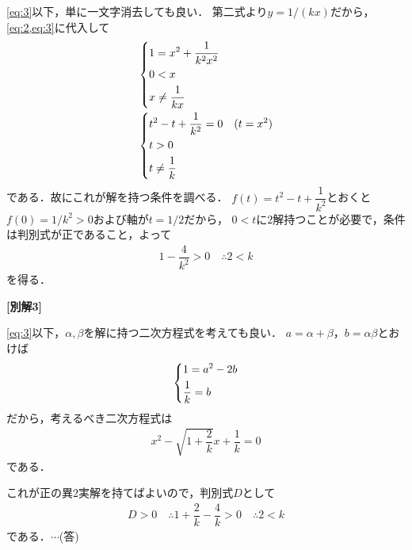 \documentclass[../../main.tex]{subfiles}
\begin{document}
\cref{eq:3}以下，単に一文字消去しても良い．
第二式より$y = 1/(kx)$だから，\cref{eq:2,eq:3}に代入して
\begin{align}
  &
  \begin{dcases}
    1 = x^2 + \dfrac{1}{k^2x^2} \\
    0 < x \\
    x \neq \dfrac{1}{kx}
  \end{dcases} \\
  &
  \begin{dcases}
    t^2 -t + \dfrac{1}{k^2} = 0 & (t=x^2) \\
    t > 0 \\
    t \neq \dfrac{1}{k}
  \end{dcases}
\end{align}
である．故にこれが解を持つ条件を調べる．
$f(t)=t^2 -t + \dfrac{1}{k^2}$とおくと$f(0)=1/k^2>0$および軸が$t=1/2$だから，
$0<t$に$2$解持つことが必要で，条件は判別式が正であること，よって
\begin{align}
  1 - \dfrac{4}{k^2} > 0 \quad \therefore 2 < k
\end{align}
を得る．

{\bf [別解3]}

\cref{eq:3}以下，$\alpha,\beta$を解に持つ二次方程式を考えても良い．
$a=\alpha+\beta$，$b=\alpha\beta$とおけば
\begin{align}
  \begin{dcases}
    1 = a^2 - 2b \\
    \dfrac{1}{k} = b
  \end{dcases}
\end{align}
だから，考えるべき二次方程式は
\begin{align}
  x^2 - \sqrt{1+\dfrac{2}{k}} x + \dfrac{1}{k} = 0
\end{align}
である．

これが正の異$2$実解を持てばよいので，判別式$D$として
\begin{align}
  D>0 \quad \therefore 1+\dfrac{2}{k} - \dfrac{4}{k} > 0 \quad \therefore 2 < k
\end{align}
である．$\cdots$(答)

\newpage
\end{document}
